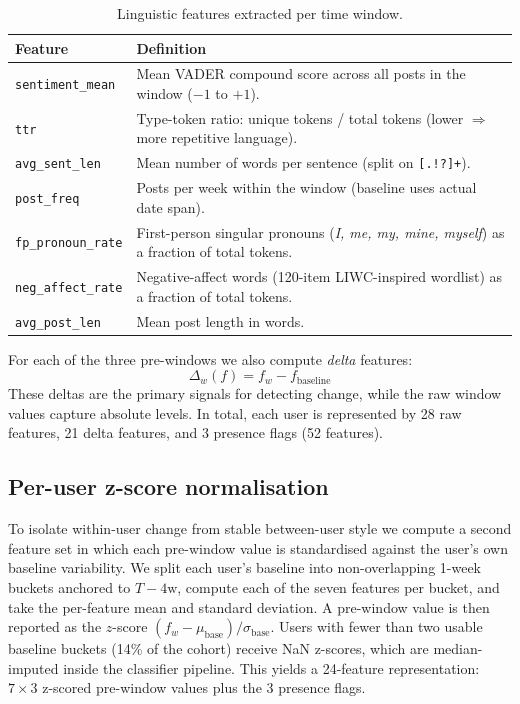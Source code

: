 \documentclass[11pt]{article}
\begin{document}
\begin{table}[h]
\small
\centering
\begin{tabular}{lp{6cm}}
\toprule
\textbf{Feature} & \textbf{Definition} \\
\midrule
\texttt{sentiment\_mean} &
  Mean VADER compound score across all posts in the window ($-1$ to $+1$). \\
\texttt{ttr} &
  Type-token ratio: unique tokens / total tokens (lower $\Rightarrow$ more
  repetitive language). \\
\texttt{avg\_sent\_len} &
  Mean number of words per sentence (split on \texttt{[.!?]+}). \\
\texttt{post\_freq} &
  Posts per week within the window (baseline uses actual date span). \\
\texttt{fp\_pronoun\_rate} &
  First-person singular pronouns (\textit{I, me, my, mine, myself})
  as a fraction of total tokens. \\
\texttt{neg\_affect\_rate} &
  Negative-affect words (120-item LIWC-inspired wordlist) as a fraction
  of total tokens. \\
\texttt{avg\_post\_len} &
  Mean post length in words. \\
\bottomrule
\end{tabular}
\caption{Linguistic features extracted per time window.}
\label{tab:features}
\end{table}

For each of the three pre-windows we also compute \emph{delta} features:
\[
  \Delta_w(f) = f_w - f_{\text{baseline}}
\]
These deltas are the primary signals for detecting change, while the
raw window values capture absolute levels.
In total, each user is represented by 28 raw features, 21 delta features,
and 3 presence flags (52 features).

\subsection{Per-user z-score normalisation}
\label{sec:znorm}
To isolate within-user change from stable between-user style we
compute a second feature set in which each pre-window value is
standardised against the user's own baseline variability.
We split each user's baseline into non-overlapping 1-week buckets
anchored to $T - 4\text{w}$, compute each of the seven features per
bucket, and take the per-feature mean and standard deviation.
A pre-window value is then reported as the $z$-score
$(f_w - \mu_{\text{base}}) / \sigma_{\text{base}}$.
Users with fewer than two usable baseline buckets (14\% of the cohort)
receive NaN z-scores, which are median-imputed inside the classifier
pipeline.
This yields a 24-feature representation: $7 \times 3$ z-scored pre-window
values plus the 3 presence flags.
\end{document}
